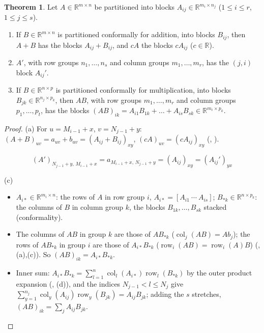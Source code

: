\documentclass[12pt]{article}
\newcommand{\R}{\mathbb R}
\DeclareMathOperator{\col}{col}
\theoremstyle{definition}
\newtheorem{theorem}{Theorem}
\DeclareMathOperator{\row}{row}
\begin{document}
\begin{theorem}\label{b5.3}\label{b5.6}
Let \(A\in\R^{m\times n}\) be partitioned into blocks \(A_{ij}\in\R^{m_i\times n_j}\) (\(1\leqslant i\leqslant r\),
\(1\leqslant j\leqslant s\)).
\begin{enumerate}
\item If \(B\in\R^{m\times n}\) is partitioned conformally for addition, into blocks \(B_{ij}\), then \(A+B\) has the blocks
\(A_{ij}+B_{ij}\), and \(cA\) the blocks \(cA_{ij}\) (\(c\in\R\)).
\item \(A'\), with row groups \(n_1,\dots,n_s\) and column groups \(m_1,\dots,m_r\), has the \((j,i)\) block \(A_{ij}'\).
\item If \(B\in\R^{n\times p}\) is partitioned conformally for multiplication, into blocks
\(B_{jk}\in\R^{n_j\times p_k}\), then \(AB\), with row groups \(m_1,\dots,m_r\) and column groups \(p_1,\dots,p_t\), has the
blocks \((AB)_{ik}=A_{i1}B_{1k}+\dots+A_{is}B_{sk}\in\R^{m_i\times p_k}\).
\end{enumerate}
\end{theorem}
\begin{proof}
(a) For \(u=M_{i-1}+x\), \(v=N_{j-1}+y\): \((A+B)_{uv}=a_{uv}+b_{uv}=(A_{ij}+B_{ij})_{xy}\), \((cA)_{uv}=(cA_{ij})_{xy}\)
(, ).
\begin{board}
\[
(A')_{N_{j-1}+y,\,M_{i-1}+x}=a_{M_{i-1}+x,\,N_{j-1}+y}=(A_{ij})_{xy}=(A_{ij}')_{yx}
\]
\end{board}
(c)
\begin{itemize}
\item \(A_{i*}\in\R^{m_i\times n}\): the rows of \(A\) in row group \(i\), \(A_{i*}=[A_{i1}\ \cdots\ A_{is}]\);
\(B_{*k}\in\R^{n\times p_k}\): the columns of \(B\) in column group \(k\), the blocks \(B_{1k},\dots,B_{sk}\) stacked
(conformality).
\item The columns of \(AB\) in group \(k\) are those of \(AB_{*k}\) (\(\col_j(AB)=Ab_j\)); the rows of \(AB_{*k}\) in group
\(i\) are those of \(A_{i*}B_{*k}\) (\(\row_i(AB)=\row_i(A)B\)) (, (a),(c)). So
\((AB)_{ik}=A_{i*}B_{*k}\).
\item Inner sum: \(A_{i*}B_{*k}=\sum_{l=1}^n\col_l(A_{i*})\row_l(B_{*k})\) by the outer product expansion
(, (d)), and the indices \(N_{j-1}<l\leqslant N_j\) give
\(\sum_{y=1}^{n_j}\col_y(A_{ij})\row_y(B_{jk})=A_{ij}B_{jk}\); adding the \(s\) stretches,
\((AB)_{ik}=\sum_jA_{ij}B_{jk}\).\qedhere
\end{itemize}
\end{proof}
\end{document}
